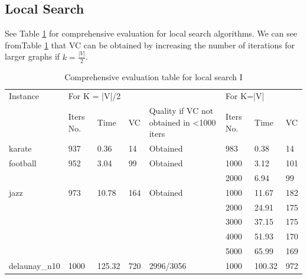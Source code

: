 \subsection{Local Search}
See Table \ref{tab2} for comprehensive evaluation for local search algorithms. We can see fromTable \ref{tab2} that VC can be obtained by increasing the number of iterations for larger graphs if $k=\frac{\left| V \right|}{2}$.
\begin{table}[htb]
\caption{Comprehensive evaluation table for local search I}
\label{tab2}
\begin{minipage}{\columnwidth}
\begin{center}
\begin{tabular}{@{}llllllll@{}}
\toprule
Instance      & \multicolumn{4}{l}{For K = |V|/2}                                             & \multicolumn{3}{l}{For K=|V|} \\ 
              & Iters No. & Time   & VC  & Quality if VC not obtained in \textless 1000 iters & Iters No.   & Time     & VC   \\ \midrule
karate        & 937       & 0.36   & 14  & Obtained                                           & 983         & 0.38     & 14   \\ \midrule
football      & 952       & 3.04   & 99  & Obtained                                           & 1000        & 3.12     & 101  \\
              &           &        &     &                                                    & 2000        & 6.94     & 99   \\ \midrule
jazz          & 973       & 10.78  & 164 & Obtained                                           & 1000        & 11.67    & 182  \\
              &           &        &     &                                                    & 2000        & 24.91    & 175  \\
              &           &        &     &                                                    & 3000        & 37.15    & 175  \\
              &           &        &     &                                                    & 4000        & 51.93    & 170  \\
              &           &        &     &                                                    & 5000        & 65.99    & 169  \\ \midrule
delaunay\_n10 & 1000      & 125.32 & 720 & 2996/3056                                          & 1000        & 100.32   & 972  \\

\end{tabular}
\end{center}
\end{minipage}
\end{table}
